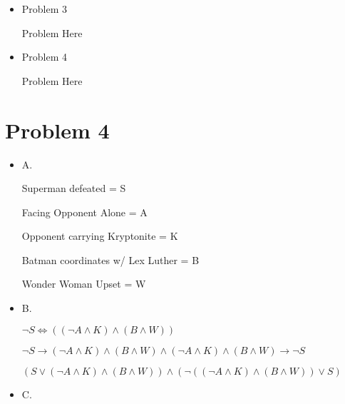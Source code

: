\documentclass{article}
\begin{document}
	
	\begin{itemize}
		
		\item Problem 3
		
		Problem Here
		
		\item Problem 4
		
		Problem Here
		
	\end{itemize}
	
	\section*{Problem 4}
	\begin{itemize}
		\item
		A.
		
		Superman defeated = S
		
		Facing Opponent Alone = A
		
		Opponent carrying Kryptonite = K
		
		Batman coordinates w/ Lex Luther = B
		
		Wonder Woman Upset = W
		
		\item
		B. 
		\begin{center}
			$\lnot S \iff ((\lnot A \land K) \land (B \land W))$
			
			$\lnot S \rightarrow (\lnot A \land K) \land (B \land W) \land (\lnot A \land K) \land (B \land W) \rightarrow \lnot S$
			
			$(S \lor (\lnot A \land K) \land (B \land W)) \land (\lnot((\lnot A \land K) \land (B \land W)) \lor S) $
		\end{center}
		\item
		C.
	\end{itemize}
\end{document}
